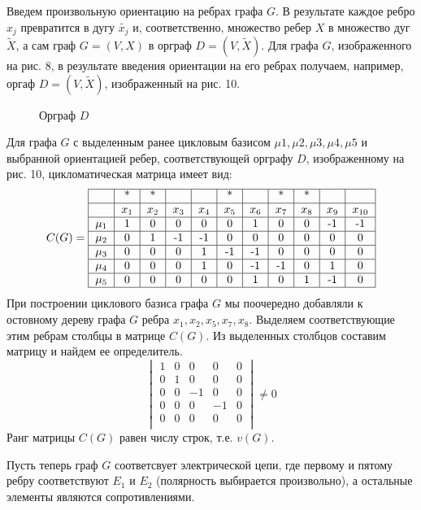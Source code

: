 \documentclass[12pt, letterpaper, titlepage]{article}
\begin{document}
Введем произвольную ориентацию на ребрах графа $G$. В результате каждое ребро $x_j$ превратится
в дугу $\tilde{x_j}$ и, соответственно, множество ребер $X$ в множество дуг $\widetilde{X}$,
а сам граф $G=(V,X)$ в орграф $D=(V,\widetilde{X})$. Для графа $G$, изображенного на рис. 8,
в результате введения ориентации на его ребрах получаем, например, оргаф $D=(V, \widetilde{X})$,
изображенный на рис. 10.
\begin{figure}[H]\centering\caption{Орграф $D$}\end{figure}
Для графа $G$ с выделенным ранее цикловым базисом $\mu1,\mu2,\mu3,\mu4,\mu5$ и выбранной ориентацией ребер,
соответствующей орграфу $D$, изображенному на рис. 10, цикломатическая матрица имеет вид:
\[
C(G)=
\begin{tabular}{|c|c|c|c|c|c|c|c|c|c|c|}
    \hline
    &*&*&&&*&&*&*&&\\
    \hline
    & $x_1$ & $x_2$ & $x_3$ & $x_4$ & $x_5$ & $x_6$ & $x_7$ & $x_8$ & $x_9$ & $x_{10}$\\
    \hline
    $\mu_1$ & 1 & 0 & 0 & 0 & 0 & 1 & 0 & 0 & -1 & -1 \\
    \hline
    $\mu_2$ & 0 & 1 & -1 & -1 & 0 & 0 & 0 & 0& 0& 0\\
    \hline
    $\mu_3$ & 0 & 0 & 0 & 1 & -1 & -1 & 0& 0& 0& 0 \\
    \hline
    $\mu_4$ & 0 & 0 & 0 & 1 & 0 & -1 & -1&0& 1& 0 \\
    \hline
    $\mu_5$ & 0 & 0 & 0 & 0 & 0 & 1 & 0 &1& -1& 0 \\
    \hline
\end{tabular}
\]
При построении циклового базиса графа $G$ мы поочередно добавляли к остовному дереву
графа $G$ ребра $x_1,x_2,x_5,x_7,x_8$. Выделяем соответствующие этим ребрам столбцы
в матрице $C(G)$. Из выделенных столбцов составим матрицу и найдем ее определитель.
\[
    \begin{vmatrix}
    1&0&0&0&0\\
    0&1&0&0&0\\
    0&0&-1&0&0\\
    0&0&0&-1&0\\
    0&0&0&0&0\\
    \end{vmatrix}
    \neq0
\]
Ранг матрицы $C(G)$ равен числу строк, т.е. $v(G)$.

Пусть теперь граф $G$ соответсвует электрической цепи, где первому и пятому ребру соответствуют
$E_1$ и $E_2$ (полярность выбирается произвольно), а остальные элементы являются сопротивлениями.
\end{document}
